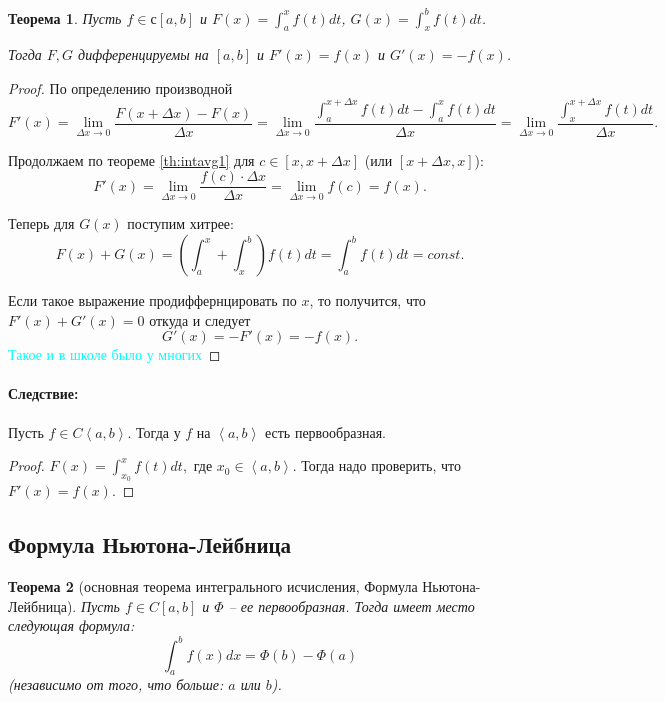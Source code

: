 \documentclass{article}
\theoremstyle{plain}
\newtheorem{theorem}{Теорема}
\theoremstyle{definition}
\theoremstyle{remark}
\begin{document}
\begin{theorem}
Пусть $f\in \mathbb{с}[a, b]$ и $\displaystyle F(x) = \int_a^x f(t)dt$, $\displaystyle G(x) =\int_x^b f(t)dt$.

Тогда $F, G$ дифференцируемы на $[a,b]$ и $F'(x) = f(x)$ и $G'(x) = -f(x)$.
\end{theorem}


\begin{proof}
По определению производной $$F'(x) = \lim_{\Delta x \to 0} \frac{F(x+\Delta x) - F(x)}{\Delta x} = \lim_{\Delta x \to 0} \frac{\int_a^{x+\Delta x}f(t)dt - \int_a^{x}f(t)dt}{\Delta x} = \lim_{\Delta x \to 0} \frac{\int_x^{x+\Delta x}f(t)dt}{\Delta x}.$$

Продолжаем по теореме \ref{th:intavg1} для $c\in [x, x+\Delta x]$ (или $[x+\Delta x, x]$):
$$F'(x)= \lim_{\Delta x \to 0} \frac{f(c)\cdot \Delta x}{\Delta x} = \lim_{\Delta x \to 0}f(c) = f(x).$$

Теперь для $G(x)$ поступим хитрее:
$$F(x) + G(x) = \left(\int_a^x + \int _x^b\right)f(t)dt = \int_a^b f(t)dt = const.$$

Если такое выражение продиффернцировать по $x$, то получится, что $F'(x) + G'(x) = 0$ откуда и следует $$G'(x) = -F'(x) = -f(x).$$
\textcolor{cyan}{Такое и в школе было у многих}
\end{proof}



\paragraph{Следствие:} Пусть $f\in C\left<a, b\right>$. Тогда у $f$ на $\left<a, b\right>$ есть первообразная. 

\begin{proof}
$F(x) = \int_{x_0}^x f(t)dt,$ где $x_0\in \left<a, b\right>$. Тогда надо проверить, что $F'(x) = f(x)$.
\end{proof}

\subsection{Формула Ньютона-Лейбница}
\begin{theorem}[основная теорема интегрального исчисления, Формула Ньютона-Лейбница]\label{th:nlformula} Пусть $f\in C[a,b]$ и $\Phi$ -- ее первообразная.
Тогда имеет место следующая формула: $$\int_a^b f(x)dx = \Phi(b) - \Phi(a)$$ (независимо от того, что больше: $a$ или $b$).
\end{theorem}
\end{document}
